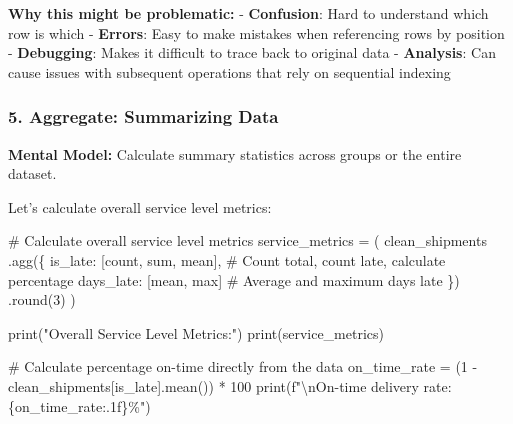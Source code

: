 \documentclass[
  letterpaper,
  DIV=11,
  numbers=noendperiod]{scrartcl}
\newenvironment{Shaded}{\begin{snugshade}}{\end{snugshade}}
\newcommand{\BuiltInTok}[1]{\textcolor[rgb]{0.00,0.23,0.31}{#1}}
\newcommand{\CharTok}[1]{\textcolor[rgb]{0.13,0.47,0.30}{#1}}
\newcommand{\CommentTok}[1]{\textcolor[rgb]{0.37,0.37,0.37}{#1}}
\newcommand{\DecValTok}[1]{\textcolor[rgb]{0.68,0.00,0.00}{#1}}
\newcommand{\NormalTok}[1]{\textcolor[rgb]{0.00,0.23,0.31}{#1}}
\newcommand{\OperatorTok}[1]{\textcolor[rgb]{0.37,0.37,0.37}{#1}}
\newcommand{\SpecialCharTok}[1]{\textcolor[rgb]{0.37,0.37,0.37}{#1}}
\newcommand{\SpecialStringTok}[1]{\textcolor[rgb]{0.13,0.47,0.30}{#1}}
\newcommand{\StringTok}[1]{\textcolor[rgb]{0.13,0.47,0.30}{#1}}
\begin{document}
\textbf{Why this might be problematic:} - \textbf{Confusion}: Hard to
understand which row is which - \textbf{Errors}: Easy to make mistakes
when referencing rows by position - \textbf{Debugging}: Makes it
difficult to trace back to original data - \textbf{Analysis}: Can cause
issues with subsequent operations that rely on sequential indexing

\subsubsection{5. Aggregate: Summarizing
Data}\label{aggregate-summarizing-data}

\textbf{Mental Model:} Calculate summary statistics across groups or the
entire dataset.

Let's calculate overall service level metrics:

\label{mental-model-5-aggregate}
\begin{Shaded}
\begin{Highlighting}[]
\CommentTok{\# Calculate overall service level metrics}
\NormalTok{service\_metrics }\OperatorTok{=}\NormalTok{ (}
\NormalTok{    clean\_shipments}
\NormalTok{    .agg(\{}
        \StringTok{\textquotesingle{}is\_late\textquotesingle{}}\NormalTok{: [}\StringTok{\textquotesingle{}count\textquotesingle{}}\NormalTok{, }\StringTok{\textquotesingle{}sum\textquotesingle{}}\NormalTok{, }\StringTok{\textquotesingle{}mean\textquotesingle{}}\NormalTok{],  }\CommentTok{\# Count total, count late, calculate percentage}
        \StringTok{\textquotesingle{}days\_late\textquotesingle{}}\NormalTok{: [}\StringTok{\textquotesingle{}mean\textquotesingle{}}\NormalTok{, }\StringTok{\textquotesingle{}max\textquotesingle{}}\NormalTok{]  }\CommentTok{\# Average and maximum days late}
\NormalTok{    \})}
\NormalTok{    .}\BuiltInTok{round}\NormalTok{(}\DecValTok{3}\NormalTok{)}
\NormalTok{)}

\BuiltInTok{print}\NormalTok{(}\StringTok{"Overall Service Level Metrics:"}\NormalTok{)}
\BuiltInTok{print}\NormalTok{(service\_metrics)}

\CommentTok{\# Calculate percentage on{-}time directly from the data}
\NormalTok{on\_time\_rate }\OperatorTok{=}\NormalTok{ (}\DecValTok{1} \OperatorTok{{-}}\NormalTok{ clean\_shipments[}\StringTok{\textquotesingle{}is\_late\textquotesingle{}}\NormalTok{].mean()) }\OperatorTok{*} \DecValTok{100}
\BuiltInTok{print}\NormalTok{(}\SpecialStringTok{f"}\CharTok{\textbackslash{}n}\SpecialStringTok{On{-}time delivery rate: }\SpecialCharTok{\{}\NormalTok{on\_time\_rate}\SpecialCharTok{:.1f\}}\SpecialStringTok{\%"}\NormalTok{)}
\end{Highlighting}
\end{Shaded}
\end{document}
